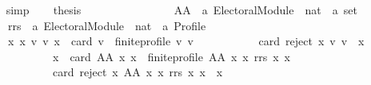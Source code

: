 \begin{isabellebody}
\ \ \ \ \isamarkupfalse%
\ simp\isanewline
\ \ \isamarkupfalse%
\ {\isacharquery}{\kern0pt}thesis\isanewline
\ \ \isamarkupfalse%
\ {\isacharminus}{\kern0pt}\ \isanewline
\ \ \ \ \isamarkupfalse%
\isanewline
\ \ \ \ \ \ AA\ {\isacharcolon}{\kern0pt}{\isacharcolon}{\kern0pt}\ {\isachardoublequoteopen}{\isacharparenleft}{\kern0pt}{\isacharprime}{\kern0pt}a\ Electoral{\isacharunderscore}{\kern0pt}Module{\isacharparenright}{\kern0pt}\ {\isasymRightarrow}\ nat\ {\isasymRightarrow}\ {\isacharprime}{\kern0pt}a\ set{\isachardoublequoteclose}\ \isanewline
\ \ \ \ \ \ rrs\ {\isacharcolon}{\kern0pt}{\isacharcolon}{\kern0pt}\ {\isachardoublequoteopen}{\isacharparenleft}{\kern0pt}{\isacharprime}{\kern0pt}a\ Electoral{\isacharunderscore}{\kern0pt}Module{\isacharparenright}{\kern0pt}\ {\isasymRightarrow}\ nat\ {\isasymRightarrow}\ {\isacharprime}{\kern0pt}a\ Profile{\isachardoublequoteclose}\ \isanewline
\ \ \ \ \ \ {\isachardoublequoteopen}{\isasymforall}x{}\ x{}{\isachardot}{\kern0pt}\ {\isacharparenleft}{\kern0pt}{\isasymexists}v{}\ v{}{\isachardot}{\kern0pt}\ {\isacharparenleft}{\kern0pt}x{}\ {\isasymle}\ card\ v{}\ {\isasymand}\ finite{\isacharunderscore}{\kern0pt}profile\ v{}\ v{}{\isacharparenright}{\kern0pt}\ {\isasymand}\isanewline
\ \ \ \ \ \ \ \ \ \ card\ {\isacharparenleft}{\kern0pt}reject\ x{}\ v{}\ v{}{\isacharparenright}{\kern0pt}\ {\isasymnoteq}\ x{}{\isacharparenright}{\kern0pt}\ {\isacharequal}{\kern0pt}\isanewline
\ \ \ \ \ \ \ \ \ \ \ \ \ \ {\isacharparenleft}{\kern0pt}{\isacharparenleft}{\kern0pt}x{}\ {\isasymle}\ card\ {\isacharparenleft}{\kern0pt}AA\ x{}\ x{}{\isacharparenright}{\kern0pt}\ {\isasymand}\ finite{\isacharunderscore}{\kern0pt}profile\ {\isacharparenleft}{\kern0pt}AA\ x{}\ x{}{\isacharparenright}{\kern0pt}\ {\isacharparenleft}{\kern0pt}rrs\ x{}\ x{}{\isacharparenright}{\kern0pt}{\isacharparenright}{\kern0pt}\ {\isasymand}\isanewline
\ \ \ \ \ \ \ \ \ \ \ \ \ \ card\ {\isacharparenleft}{\kern0pt}reject\ x{}\ {\isacharparenleft}{\kern0pt}AA\ x{}\ x{}{\isacharparenright}{\kern0pt}\ {\isacharparenleft}{\kern0pt}rrs\ x{}\ x{}{\isacharparenright}{\kern0pt}{\isacharparenright}{\kern0pt}\ {\isasymnoteq}\ x{}{\isacharparenright}{\kern0pt}{\isachardoublequoteclose}\isanewline

\end{isabellebody}
